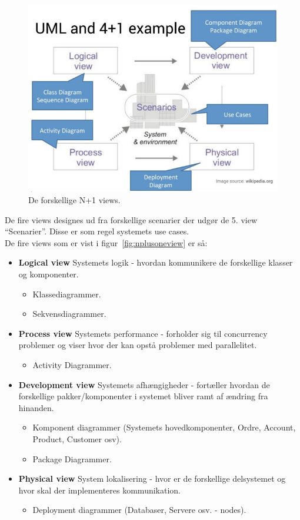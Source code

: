 \begin{figure}[H]
	\centering
	\includegraphics[width=0.8\linewidth]{figs/nplusonedia}
	\caption{De forskellige N+1 views.}
	\label{fig:nplusonedia}
\end{figure}

De fire views designes ud fra forskellige scenarier der udgør de 5. view “Scenarier”. Disse er som regel systemets use cases.\\

De fire views som er vist i figur~\ref{fig:nplusoneview} er så:
\begin{itemize}
	\item \textbf{Logical view} Systemets logik - hvordan kommunikere de forskellige klasser og komponenter.
	\begin{itemize}
		\item Klassediagrammer.
		\item Sekvensdiagrammer.
	\end{itemize}
	\item \textbf{Process view} Systemets performance - forholder sig til concurrency problemer og viser hvor der kan opstå problemer med parallelitet.
	\begin{itemize}
		\item Activity Diagrammer.
	\end{itemize}
	\item \textbf{Development view}	Systemets afhængigheder - fortæller hvordan de forskellige pakker/komponenter i systemet bliver ramt af ændring fra hinanden.
	\begin{itemize}
		\item Komponent diagrammer (Systemets hovedkomponenter, Ordre, Account, Product, Customer osv).
		\item Package Diagrammer.
	\end{itemize}
	\item \textbf{Physical view} System lokalisering - hvor er de forskellige delsystemet og hvor skal der implementeres kommunikation.
	\begin{itemize}
		\item Deployment diagrammer (Databaser, Servere osv. - nodes).
	\end{itemize}
\end{itemize}